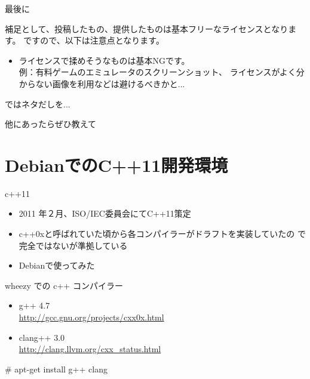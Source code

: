 \begin{frame}{最後に}

 補足として、投稿したもの、提供したものは基本フリーなライセンスとなります。
ですので、以下は注意点となります。
 
\begin{itemize}
\item ライセンスで揉めそうなものは基本NGです。\\
例：有料ゲームのエミュレータのスクリーンショット、
ライセンスがよく分からない画像を利用などは避けるべきかと...
\end{itemize}

\end{frame}

\begin{frame}{ではネタだしを...}

\begin{center}
\Large
他にあったらぜひ教えて
\end{center}

\end{frame}

\section{DebianでのC++11開発環境}

\begin{frame}{c++11}

\begin{itemize}
 \item 2011 年２月、ISO/IEC委員会にてC++11策定
 \item c++0xと呼ばれていた頃から各コンパイラーがドラフトを実装していたの
       で完全ではないが準拠している
 \item Debianで使ってみた
\end{itemize}
\end{frame}

\begin{frame}[containsverbatim]{wheezy での c++ コンパイラー}
\begin{itemize}
 \item g++ 4.7 \\ \url{http://gcc.gnu.org/projects/cxx0x.html}
 \item clang++ 3.0 \\
       \url{http://clang.llvm.org/cxx_status.html}
\end{itemize}
\begin{commandline}
# apt-get install g++ clang
\end{commandline}
\end{frame}

